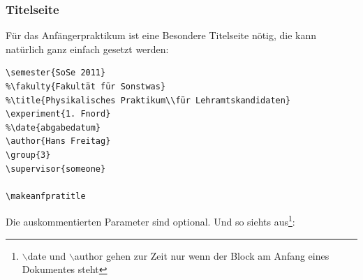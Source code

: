 \documentclass[a4paper]{article}
\begin{document}
\subsubsection{Titelseite}

Für das Anfängerpraktikum ist eine Besondere Titelseite nötig, die
kann natürlich ganz einfach gesetzt werden:

\begin{verbatim}
\semester{SoSe 2011}
%\fakulty{Fakultät für Sonstwas}
%\title{Physikalisches Praktikum\\für Lehramtskandidaten}
\experiment{1. Fnord}
%\date{abgabedatum}
\author{Hans Freitag}
\group{3}
\supervisor{someone}

\makeanfpratitle
\end{verbatim}

Die auskommentierten Parameter sind optional. Und so siehts
aus\footnote{$\backslash$date und $\backslash$author gehen zur Zeit nur wenn der Block am
Anfang eines Dokumentes steht}:

\makeanfpratitle
\end{document}

